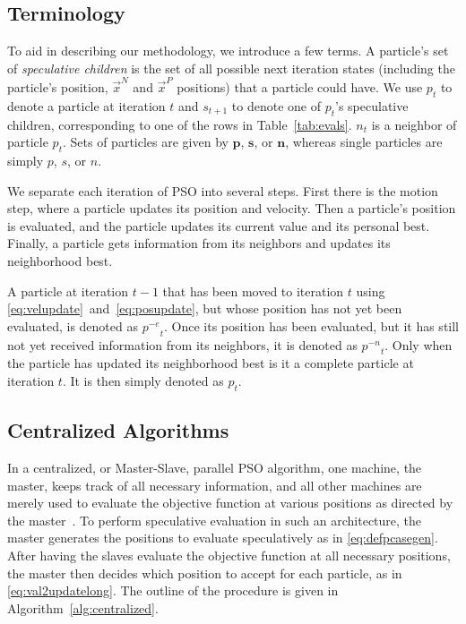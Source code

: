 \documentclass[smallcondensed]{svjour3}
\newcommand{\alg}[1]{Algorithm~\ref{alg:#1}}
\providecommand{\pers}{\ensuremath{P}}
\providecommand{\neigh}{\ensuremath{N}}
\providecommand{\nbest}{\ensuremath{\Vec{x}^\neigh}}
\providecommand{\pbest}{\ensuremath{\Vec{x}^\pers}}
\providecommand{\noeval}[1]{\ensuremath{#1^{-e}}}
\providecommand{\nonbest}[1]{\ensuremath{#1^{-n}}}
\providecommand{\p}{\ensuremath{p}}
\providecommand{\pset}{\ensuremath{\mathbf{p}}}
\providecommand{\s}{\ensuremath{s}}
\providecommand{\sset}{\ensuremath{\mathbf{s}}}
\providecommand{\n}{\ensuremath{n}}
\providecommand{\nset}{\ensuremath{\mathbf{n}}}
\begin{document}
\subsection{Terminology}

To aid in describing our methodology, we introduce a few terms.  A particle's
set of \emph{speculative children} is the set of all possible next iteration
states (including the particle's position, $\nbest$ and $\pbest$ positions)
that a particle could have.  We use $\p_t$ to denote a particle at iteration
$t$ and $\s_{t+1}$ to denote one of $\p_t$'s speculative children,
corresponding to one of the rows in Table~\ref{tab:evals}.  $\n_t$ is a
neighbor of particle $\p_t$.  Sets of particles are given by $\pset$, $\sset$,
or $\nset$, whereas single particles are simply $\p$, $\s$, or $\n$.

We separate each iteration of PSO into several steps.  First there is the
motion step, where a particle updates its position and velocity.  Then a
particle's position is evaluated, and the particle updates its current value
and its personal best.  Finally, a particle gets information from its neighbors
and updates its neighborhood best.

A particle at iteration $t-1$ that has been moved to iteration $t$ using
\eqref{eq:velupdate}~and~\eqref{eq:posupdate}, but whose position has
not yet been evaluated, is denoted as $\noeval{\p}_t$.  Once its position has
been evaluated, but it has still not yet received information from its
neighbors, it is denoted as $\nonbest{\p}_t$.  Only when the particle has
updated its neighborhood best is it a complete particle at iteration $t$.  It
is then simply denoted as $\p_t$.

\subsection{Centralized Algorithms}

In a centralized, or Master-Slave, parallel PSO algorithm, one machine, the
master, keeps track of all necessary information, and all other machines are
merely used to evaluate the objective function at various positions as directed
by the master~\citep{belal-2004-parallel-models-for-pso}.  To perform
speculative evaluation in such an architecture, the master generates the
positions to evaluate speculatively as in \eqref{eq:defpcasegen}.  After having
the slaves evaluate the objective function at all necessary positions, the
master then decides which position to accept for each particle, as in
\eqref{eq:val2updatelong}.  The outline of the procedure is given in
\alg{centralized}.
\end{document}
